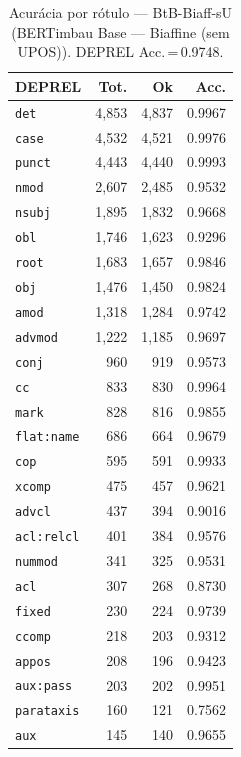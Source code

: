 \begin{table}[ht]
\centering
\caption{Acurácia por rótulo --- BtB-Biaff-sU (BERTimbau Base — Biaffine (sem UPOS)). DEPREL Acc.\,=\,0.9748.}
\label{tab:acc-predict-test-ablacao-biaffine-neuralmind-bert-base-portuguese-cased-fold0}
\scriptsize
\begin{tabular}{lrrr}
\toprule
\textbf{DEPREL} & \textbf{Tot.} & \textbf{Ok} & \textbf{Acc.} \\
\midrule
\texttt{det} & 4,853 & 4,837 & 0.9967 \\
\texttt{case} & 4,532 & 4,521 & 0.9976 \\
\texttt{punct} & 4,443 & 4,440 & 0.9993 \\
\texttt{nmod} & 2,607 & 2,485 & 0.9532 \\
\texttt{nsubj} & 1,895 & 1,832 & 0.9668 \\
\texttt{obl} & 1,746 & 1,623 & 0.9296 \\
\texttt{root} & 1,683 & 1,657 & 0.9846 \\
\texttt{obj} & 1,476 & 1,450 & 0.9824 \\
\texttt{amod} & 1,318 & 1,284 & 0.9742 \\
\texttt{advmod} & 1,222 & 1,185 & 0.9697 \\
\texttt{conj} & 960 & 919 & 0.9573 \\
\texttt{cc} & 833 & 830 & 0.9964 \\
\texttt{mark} & 828 & 816 & 0.9855 \\
\texttt{flat\!:\!name} & 686 & 664 & 0.9679 \\
\texttt{cop} & 595 & 591 & 0.9933 \\
\texttt{xcomp} & 475 & 457 & 0.9621 \\
\texttt{advcl} & 437 & 394 & 0.9016 \\
\texttt{acl\!:\!relcl} & 401 & 384 & 0.9576 \\
\texttt{nummod} & 341 & 325 & 0.9531 \\
\texttt{acl} & 307 & 268 & 0.8730 \\
\texttt{fixed} & 230 & 224 & 0.9739 \\
\texttt{ccomp} & 218 & 203 & 0.9312 \\
\texttt{appos} & 208 & 196 & 0.9423 \\
\texttt{aux\!:\!pass} & 203 & 202 & 0.9951 \\
\texttt{parataxis} & 160 & 121 & 0.7562 \\
\texttt{aux} & 145 & 140 & 0.9655 \\

\end{tabular}
\end{table}
